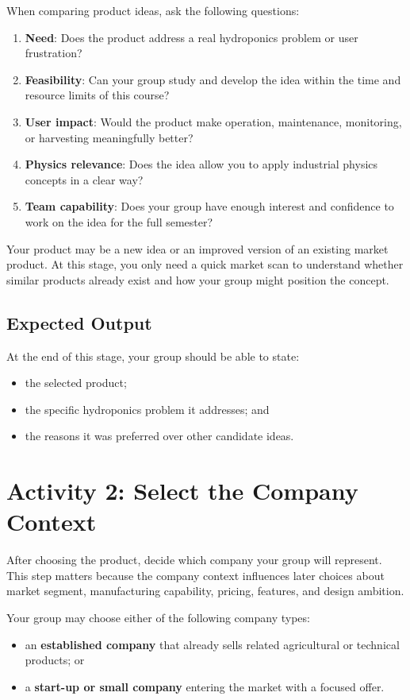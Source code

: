 When comparing product ideas, ask the following questions:
\begin{enumerate}
    \item \textbf{Need}: Does the product address a real hydroponics problem or user frustration?
    \item \textbf{Feasibility}: Can your group study and develop the idea within the time and resource limits of this course?
    \item \textbf{User impact}: Would the product make operation, maintenance, monitoring, or harvesting meaningfully better?
    \item \textbf{Physics relevance}: Does the idea allow you to apply industrial physics concepts in a clear way?
    \item \textbf{Team capability}: Does your group have enough interest and confidence to work on the idea for the full semester?
\end{enumerate}

Your product may be a new idea or an improved version of an existing market product. At this stage, you only need a quick market scan to understand whether similar products already exist and how your group might position the concept.

\subsection{Expected Output}

At the end of this stage, your group should be able to state:
\begin{itemize}
    \item the selected product;
    \item the specific hydroponics problem it addresses; and
    \item the reasons it was preferred over other candidate ideas.
\end{itemize}

\section{Activity 2: Select the Company Context}

After choosing the product, decide which company your group will represent. This step matters because the company context influences later choices about market segment, manufacturing capability, pricing, features, and design ambition.

Your group may choose either of the following company types:
\begin{itemize}
    \item an \textbf{established company} that already sells related agricultural or technical products; or
    \item a \textbf{start-up or small company} entering the market with a focused offer.
\end{itemize}

